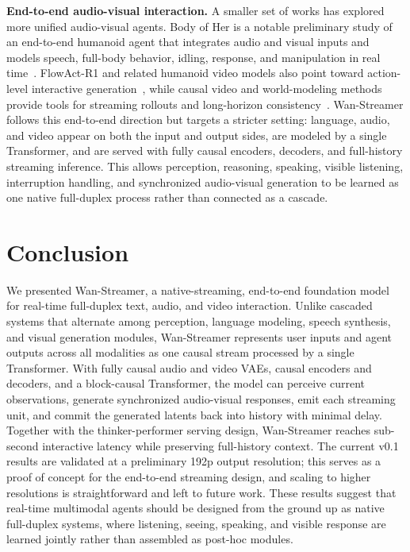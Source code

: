 \documentclass[]{style/style}
\newcommand{\model}{Wan-Streamer\xspace}
\begin{document}
\textbf{End-to-end audio-visual interaction.}
A smaller set of works has explored more unified audio-visual agents. Body of Her is a notable preliminary study of an end-to-end humanoid agent that integrates audio and visual inputs and models speech, full-body behavior, idling, response, and manipulation in real time~\citep{ao2024bodyofher}. FlowAct-R1 and related humanoid video models also point toward action-level interactive generation~\citep{flowact2026}, while causal video and world-modeling methods provide tools for streaming rollouts and long-horizon consistency~\citep{chen2024diffusionforcing,huang2025selfforcing,liu2025rollingforcing,worldplay2025,matrixgame2026}. Wan-Streamer follows this end-to-end direction but targets a stricter setting: language, audio, and video appear on both the input and output sides, are modeled by a single Transformer, and are served with fully causal encoders, decoders, and full-history streaming inference. This allows perception, reasoning, speaking, visible listening, interruption handling, and synchronized audio-visual generation to be learned as one native full-duplex process rather than connected as a cascade.


\section{Conclusion}
We presented \model, a native-streaming, end-to-end foundation model for real-time full-duplex text, audio, and video interaction. Unlike cascaded systems that alternate among perception, language modeling, speech synthesis, and visual generation modules, \model represents user inputs and agent outputs across all modalities as one causal stream processed by a single Transformer. With fully causal audio and video VAEs, causal encoders and decoders, and a block-causal Transformer, the model can perceive current observations, generate synchronized audio-visual responses, emit each streaming unit, and commit the generated latents back into history with minimal delay. Together with the thinker-performer serving design, \model reaches sub-second interactive latency while preserving full-history context. The current v0.1 results are validated at a preliminary 192p output resolution; this serves as a proof of concept for the end-to-end streaming design, and scaling to higher resolutions is straightforward and left to future work. These results suggest that real-time multimodal agents should be designed from the ground up as native full-duplex systems, where listening, seeing, speaking, and visible response are learned jointly rather than assembled as post-hoc modules.
\end{document}

